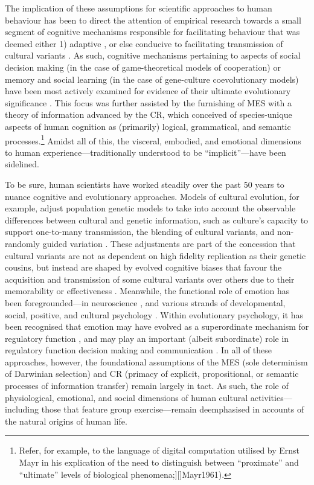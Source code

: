 \begin{CJK}{UTF8}{gbsn}
The implication of these assumptions for scientific approaches to human behaviour has been to direct the attention of empirical research towards a small segment of cognitive mechanisms responsible for facilitating behaviour that was deemed either 1) adaptive \citep[an approach that has since matured into the field of evolutionary psychology, see][]{Cosmides1992}, or else conducive to facilitating transmission of cultural variants \citep[an approach that has since matured into the field of cultural evolution][]{Cavalli-Sforza1981,Boyd1988}.  As such, cognitive mechanisms pertaining to aspects of social decision making (in the case of game-theoretical models of cooperation) or memory and social learning (in the case of gene-culture coevolutionary models) have been most actively examined for evidence of their ultimate evolutionary significance \citep{Fuentes2016}.  This focus was further assisted by the furnishing of MES with a theory of information advanced by the CR, which conceived of species-unique aspects of human cognition as (primarily) logical, grammatical, and semantic processes.\footnote{Refer, for example, to the language of digital computation utilised by Ernst Mayr in his explication of the need to distinguish between ``proximate'' and ``ultimate'' levels of biological phenomena;][]{Mayr1961}).} Amidst all of this, the visceral, embodied, and emotional dimensions to human experience---traditionally understood to be ``implicit''---have been sidelined.

To be sure, human scientists have worked steadily over the past 50 years to nuance cognitive and evolutionary approaches.  Models of cultural evolution, for example, adjust population genetic models to take into account the observable differences between cultural and genetic information, such as culture's capacity to support one-to-many transmission, the blending of cultural variants, and non-randomly guided variation \citep{Cavalli-Sforza1981,Boyd1988}.  These adjustments are part of the concession that cultural variants are not as dependent on high fidelity replication as their genetic cousins, but instead are shaped by evolved cognitive biases that favour the acquisition and transmission of some cultural variants over others due to their memorability or effectiveness \citep{Henrich2007}.  Meanwhile, the functional role of emotion has been foregrounded---in neuroscience \citep{Damasio1994}, and various strands of developmental, social, positive, and cultural psychology \citep{}. Within evolutionary psychology, it has been recognised that emotion may have evolved as a superordinate mechanism for regulatory function \citep{Cosmides2000}, and may play an important (albeit subordinate) role in regulatory function  decision making \citep{Dalgleish2004} and communication \citep{Rime2009}.  In all of these approaches, however, the foundational assumptions of the MES (sole determinism of Darwinian selection) and CR (primacy of explicit, propositional, or semantic processes of information transfer) remain largely in tact. As such, the role of physiological, emotional, and social dimensions of human cultural activities---including those that feature group exercise---remain deemphasised in accounts of the natural origins of human life.


\end{CJK}
